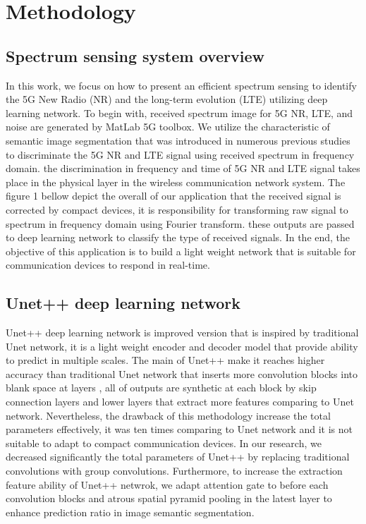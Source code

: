\documentclass[journal]{IEEEtran} %
\begin{document}
\section{Methodology}

\subsection{Spectrum sensing system overview}
In this work, we focus on how to present an efficient spectrum sensing to identify the 5G New Radio (NR) and the long-term evolution (LTE) utilizing deep learning network. To begin with, received spectrum image for 5G NR, LTE, and noise are generated by MatLab 5G toolbox. We utilize the characteristic of semantic image segmentation that was introduced in numerous previous studies to discriminate the 5G NR and LTE signal using received spectrum in frequency domain. the discrimination in frequency and time of 5G NR and LTE signal takes place in the physical layer in the wireless communication network system. The figure 1 bellow depict the overall of our application that the received signal is corrected by compact devices, it is responsibility for transforming raw signal to spectrum in frequency domain using Fourier transform. these outputs are passed to deep learning network to classify the type of received signals. In the end, the objective of this application is to build a light weight network that is suitable for communication devices to respond in real-time.

\subsection{Unet++ deep learning network}
Unet++ deep learning network \cite{b6} is improved version that is inspired by traditional Unet network, it is a light weight encoder and decoder model that provide ability to predict in multiple scales. The main of Unet++ make it reaches higher accuracy than traditional Unet network that inserts more convolution blocks into blank space at layers \cite{b6}, all of outputs are synthetic at each block by skip connection layers and lower layers that extract more features comparing to Unet network. Nevertheless, the drawback of this methodology increase the total parameters effectively, it was ten times comparing to Unet network and it is not suitable to adapt to compact communication devices. In our research, we decreased significantly the total parameters of Unet++ by replacing traditional convolutions with group convolutions. Furthermore, to increase the extraction feature ability of Unet++ netwrok, we adapt attention gate \cite{b3} to before each convolution blocks and atrous spatial pyramid pooling \cite{b10} in the latest layer to enhance prediction ratio in image semantic segmentation.
\end{document}
